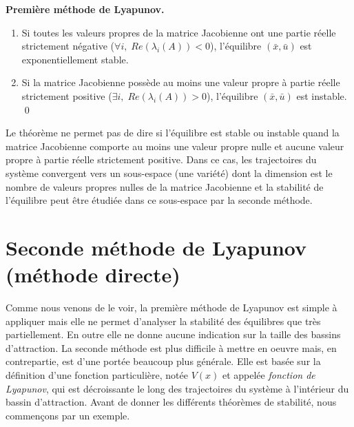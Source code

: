 \begin{theoreme}\label{premLyap}{\bf Première méthode de Lyapunov.}

\begin{enumerate}
\item Si toutes les valeurs propres de la matrice Jacobienne ont une partie réelle strictement négative ($\forall i,\;Re(\lambda_i(A))<0$), l'équilibre $(\bar x, \bar u)$ est exponentiellement stable.
\item Si la matrice Jacobienne possède au moins une valeur propre à partie réelle strictement positive ($\exists i, \;Re(\lambda_i(A)) > 0$), l'équilibre $(\bar x, \bar u)$ est instable.
\qed
\end{enumerate}
\end{theoreme}
Le théorème ne permet pas de dire si l'équilibre est stable ou instable quand la matrice Jacobienne comporte au moins une valeur propre nulle et aucune valeur propre à partie réelle strictement positive. Dans ce cas, les trajectoires du système convergent vers un sous-espace
(une variété) dont la dimension est le nombre de valeurs propres nulles de la matrice Jacobienne et la stabilité de l'équilibre peut  être
étudiée dans ce sous-espace par la seconde méthode.

\section{Seconde méthode de Lyapunov (méthode directe)}

Comme nous venons de le voir, la première méthode de Lyapunov est simple à appliquer mais elle ne permet d'analyser la stabilité des équilibres que très partiellement. En outre  elle ne donne aucune indication sur la taille des bassins d'attraction. La seconde méthode est plus difficile à mettre en oeuvre mais, en contrepartie, est d'une portée beaucoup plus générale. Elle est basée sur la définition d'une fonction particulière, notée $V(x)$ et appelée {\em fonction de Lyapunov}, qui est décroissante le long des trajectoires du système à l'intérieur du bassin d'attraction. Avant de donner les différents théorèmes de stabilité, nous commen{\c c}ons par un exemple.

